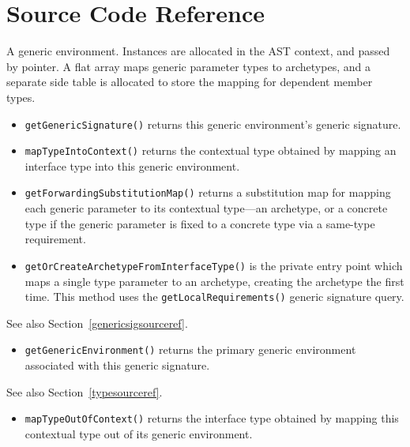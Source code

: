 \documentclass[../generics]{subfiles}
\begin{document}
\section{Source Code Reference}

A generic environment. Instances are allocated in the AST context, and passed by pointer. A flat array maps generic parameter types to archetypes, and a separate side table is allocated to store the mapping for dependent member types.
\begin{itemize}
\item \texttt{getGenericSignature()} returns this generic environment's generic signature.
\item \texttt{mapTypeIntoContext()} returns the contextual type obtained by mapping an interface type into this generic environment.
\item \texttt{getForwardingSubstitutionMap()} returns a substitution map for mapping each generic parameter to its contextual type---an archetype, or a concrete type if the generic parameter is fixed to a concrete type via a same-type requirement.

\item \texttt{getOrCreateArchetypeFromInterfaceType()} is the private entry point which maps a single type parameter to an archetype, creating the archetype the first time. This method uses the \texttt{getLocalRequirements()} generic signature query.
\end{itemize}

See also Section~\ref{genericsigsourceref}.
\begin{itemize}
\item \texttt{getGenericEnvironment()} returns the primary generic environment associated with this generic signature.
\end{itemize}

See also Section~\ref{typesourceref}.
\begin{itemize}
\item \texttt{mapTypeOutOfContext()} returns the interface type obtained by mapping this contextual type out of its generic environment.
\end{itemize}
\end{document}
